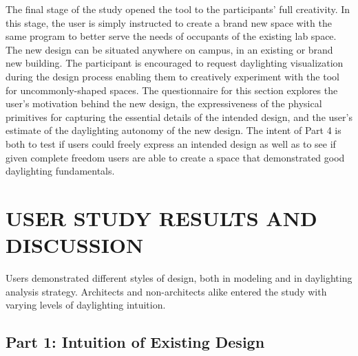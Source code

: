 \documentclass[preprint]{elsarticle}
\begin{document}
The final stage of the study opened the tool to the participants' full
creativity.  
In this stage, the user is simply instructed to create a brand new space
with the same program to better serve the needs of occupants of
the existing lab space.  The new design can be situated anywhere on
campus, in an existing or brand new building.  The participant is
encouraged to request daylighting visualization during the design
process enabling them to creatively experiment with the tool for
uncommonly-shaped spaces.
%
The questionnaire for this section explores the user's motivation
behind the new design, the expressiveness of the physical primitives
for capturing the essential details of the intended design, and the
user's estimate of the daylighting autonomy of the new design.  The
intent of Part 4 is both to test if users could freely express an
intended design as well as to see if given complete freedom users are
able to create a space that demonstrated good daylighting
fundamentals.


\section{USER STUDY RESULTS AND DISCUSSION}


Users demonstrated different styles of design, both in modeling and in
daylighting analysis strategy.  Architects and non-architects alike
entered the study with varying levels of daylighting intuition.


\subsection{Part 1: Intuition of Existing Design}

\end{document}
